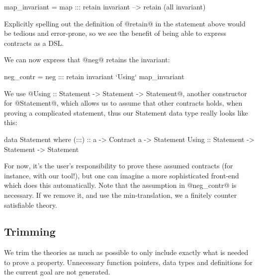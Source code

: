 \begin{code}
map_invariant = map ::: retain invariant -->
                        retain (all invariant)
\end{code}

Explicitly spelling out the definition of @retain@ in the statement
above would be tedious and error-prone, so we see the benefit of being
able to express contracts as a DSL.

We can now express that @neg@ retains the invariant:

\begin{code}
neg_contr = neg ::: retain invariant
  `Using` map_invariant
\end{code}

We use @Using :: Statement -> Statement -> Statement@, another
constructor for @Statement@, which allows us to assume that other
contracts holds, when proving a complicated statement, thus
our Statement data type really looks like this:

\begin{code}
data Statement where
    (:::) :: a -> Contract a -> Statement
    Using :: Statement -> Statement -> Statement
\end{code}

For now, it's the user's responsibility to prove these assumed
contracts (for instance, with our tool!), but one can imagine a more
sophisticated front-end which does this automatically.  Note that
the assumption in @neg_contr@ is necessary. If we remove it, and
use the min-translation, we a finitely counter satisfiable theory.

\subsection{Trimming}

We trim the theories as much as possible to only include exactly what
is needed to prove a property. Unnecessary function pointers, data
types and definitions for the current goal are not generated.

%
%
%

